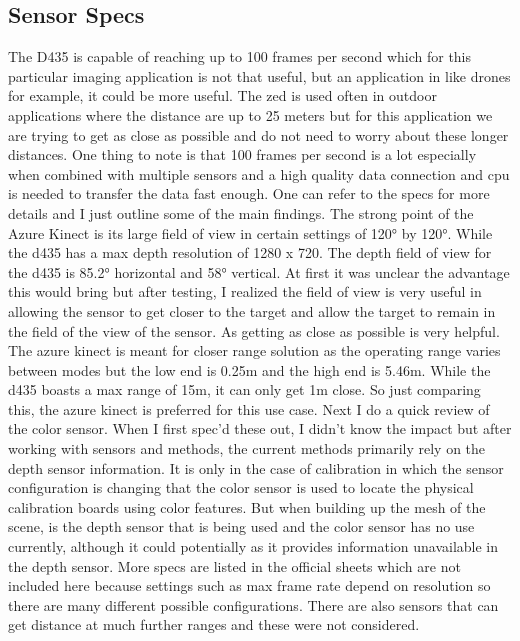 \subsection{Sensor Specs}
The D435 is capable of reaching up to 100 frames per second which for this particular imaging application is not that useful, but an application in like drones for example, it could be more useful. The zed is used often in outdoor applications where the distance are up to 25 meters but for this application we are trying to get as close as possible and do not need to worry about these longer distances. One thing to note is that 100 frames per second is a lot especially when combined with multiple sensors and a high quality data connection and cpu is needed to transfer the data fast enough. One can refer to the specs for more details and I just outline some of the main findings. The strong point of the Azure Kinect is its large field of view in certain settings of \ang{120} by \ang{120}. While the d435 has a max depth resolution of 1280 x 720. The depth field of view for the d435 is \ang{85.2} horizontal and \ang{58} vertical. At first it was unclear the advantage this would bring but after testing, I realized the field of view is very useful in allowing the sensor to get closer to the target and allow the target to remain in the field of the view of the sensor. As getting as close as possible is very helpful. The azure kinect is meant for closer range solution as the operating range varies between modes but the low end is 0.25m and the high end is 5.46m. While the d435 boasts a max range of 15m, it can only get 1m close. So just comparing this, the azure kinect is preferred for this use case. Next I do a quick review of the color sensor. When I first spec'd these out, I didn't know the impact but after working with sensors and methods, the current methods primarily rely on the depth sensor information. It is only in the case of calibration in which the sensor configuration is changing that the color sensor is used to locate the physical calibration boards using color features. But when building up the mesh of the scene, is the depth sensor that is being used and the color sensor has no use currently, although it could potentially as it provides information unavailable in the depth sensor. More specs are listed in the official sheets which are not included here because settings such as max frame rate depend on resolution so there are many different possible configurations. There are also sensors that can get distance at much further ranges and these were not considered.


